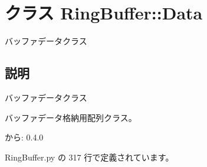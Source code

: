 \section{クラス RingBuffer::Data}
\label{classsource__py_1_1_ring_buffer_1_1_ring_buffer_1_1_data}
バッファデータクラス  




\subsection{説明}
バッファデータクラス 

バッファデータ格納用配列クラス。

\begin{Desc}
\item[から:]0.4.0 \end{Desc}


 RingBuffer.py の 317 行で定義されています。